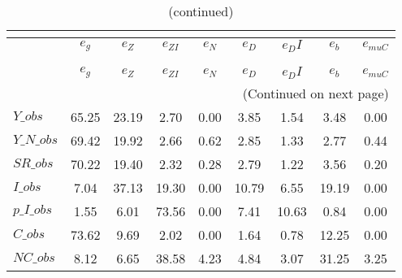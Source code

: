  
\begin{center}
\begin{longtable}{lcccccccc} 
\caption{VARIANCE DECOMPOSITION (in percent)}\\
 \label{Table:th_var_decomp_uncond}\\
\toprule 
$               $	 & 	 $        {e_g}$	 & 	 $        {e_Z}$	 & 	 $     {e_{ZI}}$	 & 	 $        {e_N}$	 & 	 $        {e_D}$	 & 	 $       {e_DI}$	 & 	 $        {e_b}$	 & 	 $    {e_{muC}}$\\
\midrule \endfirsthead 
\caption{(continued)}\\
 \toprule \\ 
$               $	 & 	 $        {e_g}$	 & 	 $        {e_Z}$	 & 	 $     {e_{ZI}}$	 & 	 $        {e_N}$	 & 	 $        {e_D}$	 & 	 $       {e_DI}$	 & 	 $        {e_b}$	 & 	 $    {e_{muC}}$\\
\midrule \endhead 
\midrule \multicolumn{9}{r}{(Continued on next page)} \\ \bottomrule \endfoot 
\bottomrule \endlastfoot 
$Y\_obs         $	 & 	        65.25	 & 	        23.19	 & 	         2.70	 & 	         0.00	 & 	         3.85	 & 	         1.54	 & 	         3.48	 & 	         0.00 \\ 
$Y\_N\_obs      $	 & 	        69.42	 & 	        19.92	 & 	         2.66	 & 	         0.62	 & 	         2.85	 & 	         1.33	 & 	         2.77	 & 	         0.44 \\ 
$SR\_obs        $	 & 	        70.22	 & 	        19.40	 & 	         2.32	 & 	         0.28	 & 	         2.79	 & 	         1.22	 & 	         3.56	 & 	         0.20 \\ 
$I\_obs         $	 & 	         7.04	 & 	        37.13	 & 	        19.30	 & 	         0.00	 & 	        10.79	 & 	         6.55	 & 	        19.19	 & 	         0.00 \\ 
$p\_I\_obs      $	 & 	         1.55	 & 	         6.01	 & 	        73.56	 & 	         0.00	 & 	         7.41	 & 	        10.63	 & 	         0.84	 & 	         0.00 \\ 
$C\_obs         $	 & 	        73.62	 & 	         9.69	 & 	         2.02	 & 	         0.00	 & 	         1.64	 & 	         0.78	 & 	        12.25	 & 	         0.00 \\ 
$NC\_obs        $	 & 	         8.12	 & 	         6.65	 & 	        38.58	 & 	         4.23	 & 	         4.84	 & 	         3.07	 & 	        31.25	 & 	         3.25 \\ 

\end{longtable}
\end{center}
